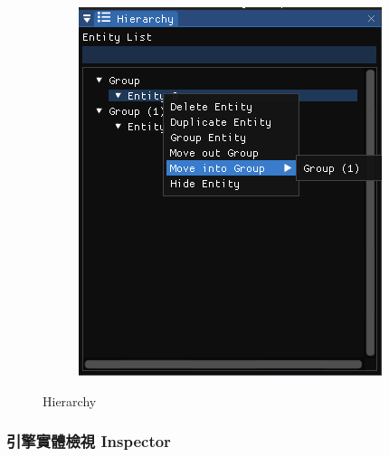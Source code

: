 \begin{figure}
\begin{subfigure}[b]{0.5\linewidth}
        \includegraphics[width=\linewidth]{./resources/editor/Hierarchy_b.png} 
    \end{subfigure}
\caption{Hierarchy}
\label{fig:Hierarchy}
\end{figure}

\subsubsection{引擎實體檢視 Inspector}

